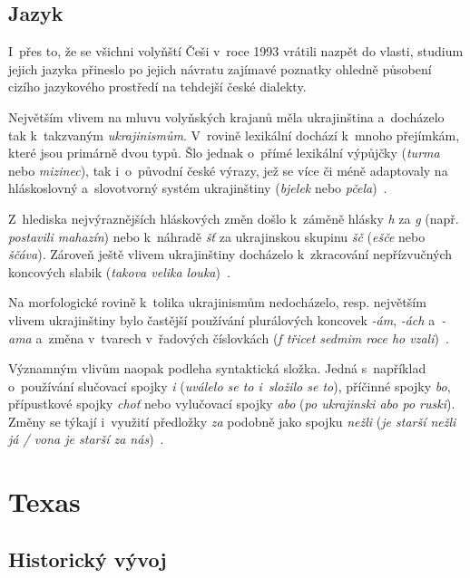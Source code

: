 \hypertarget{jazyk-1}{%
\subsection*{Jazyk}\label{jazyk-1}}

I~přes to, že se všichni volyňští Češi v~roce 1993 vrátili nazpět do vlasti, studium jejich jazyka přineslo po jejich návratu zajímavé poznatky ohledně působení cizího jazykového prostředí na tehdejší české dialekty.

Největším vlivem na mluvu volyňských krajanů měla ukrajinština a~docházelo tak k~takzvaným \emph{ukrajinismům}. V~rovině lexikální dochází k~mnoho přejímkám, které jsou primárně dvou typů. Šlo jednak o~přímé lexikální výpůjčky (\emph{turma} nebo \emph{mizinec}), tak i~o~původní české výrazy, jež se více či méně adaptovaly na hláskoslovný a~slovotvorný systém ukrajinštiny (\emph{bjelek} nebo \emph{pčela})~\parencite{Balhar2005}.

Z~hlediska nejvýraznějších hláskových změn došlo k~záměně hlásky \emph{h} za \emph{g} (např. \emph{postavili mahazín}) nebo k~náhradě \emph{šť} za ukrajinskou skupinu \emph{šč} (\emph{ešče} nebo \emph{ščáva}). Zároveň ještě vlivem ukrajinštiny docházelo k~zkracování nepřízvučných koncových slabik (\emph{takova velika louka})~\parencite{Jancakova2004}.

Na morfologické rovině k~tolika ukrajinismům nedocházelo, resp. největším vlivem ukrajinštiny bylo častější používání plurálových koncovek \emph{-ám}, \emph{-ách} a~\emph{-ama} a~změna v~tvarech v~řadových číslovkách (\emph{f třicet sedmim roce ho vzali})~\parencite{Jancakova2004}.

Významným vlivům naopak podleha syntaktická složka. Jedná s~například o~používání slučovací spojky \emph{i} (\emph{uválelo se to i~složilo se to}), příčinné spojky \emph{bo}, přípustkové spojky \emph{choť} nebo vylučovací spojky \emph{abo} (\emph{po ukrajinski abo po ruski}). Změny se týkají i~využití předložky \emph{za} podobně jako spojku \emph{nežli} (\emph{je starší nežli já / vona je starší za nás})~\parencite{Balhar2005}.

\hypertarget{texas}{%
\section{Texas}\label{texas}}

\hypertarget{historickuxfd-vuxfdvoj-2}{%
\subsection*{Historický vývoj}\label{historickuxfd-vuxfdvoj-2}}

